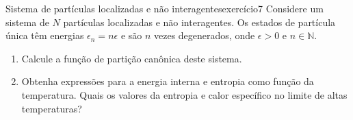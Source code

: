 \begin{exercício}{Sistema de partículas localizadas e não interagentes}{exercício7}
    Considere um sistema de \(N\) partículas localizadas e não interagentes. Os estados de partícula única têm energias \(\epsilon_n = n \epsilon\) e são \(n\) vezes degenerados, onde \(\epsilon > 0\) e \(n \in \mathbb{N}\).
    \begin{enumerate}[label=(\alph*)]
        \item Calcule a função de partição canônica deste sistema.
        \item Obtenha expressões para a energia interna e entropia como função da temperatura. Quais os valores da entropia e calor específico no limite de altas temperaturas?
    \end{enumerate}
\end{exercício}

